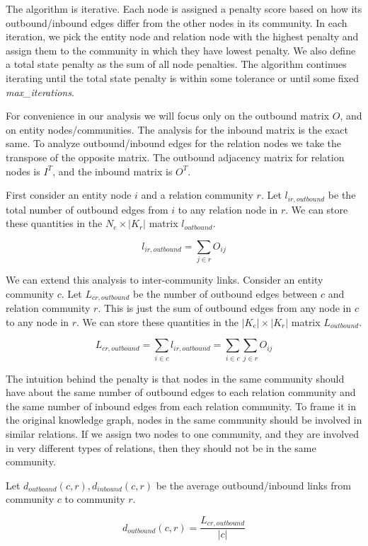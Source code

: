 \documentclass[12pt]{article}
\begin{document}
The algorithm is iterative. Each node is assigned a penalty score based on how
its outbound/inbound edges differ from the other nodes in its community. In each
iteration, we pick the entity node and relation node with the highest penalty
and assign them to the community in which they have lowest penalty. We also
define a total state penalty as the sum of all node penalties. The algorithm
continues iterating until the total state penalty is within some tolerance or
until some fixed \textit{max\_iterations}.

For convenience in our analysis we will focus only on the outbound matrix $O$,
and on entity nodes/communities. The analysis for the inbound matrix is the
exact same. To analyze outbound/inbound edges for the relation nodes we take the
transpose of the opposite matrix. The outbound adjacency matrix for relation
nodes is $I^T$, and the inbound matrix is $O^T$.

First consider an entity node $i$ and a relation community $r$. Let
$l_{ir,outbound}$ be the total number of outbound edges from $i$ to any relation
node in $r$. We can store these quantities in the $N_e\times |K_r|$ matrix
$l_{outbound}$.

$$l_{ir, outbound} = \sum_{j \in r} O_{ij}$$

We can extend this analysis to inter-community links. Consider an entity
community $c$. Let $L_{cr,outbound}$ be the number of outbound edges between $c$
and relation community $r$. This is just the sum of outbound edges from any node
in $c$ to any node in $r$. We can store these quantities in the $|K_e|\times
|K_r|$ matrix $L_{outbound}$.

$$L_{cr, outbound} = \sum_{i \in c} l_{ir, outbound} = \sum_{i \in c} \sum_{j \in r} O_{ij} $$

The intuition behind the penalty is that nodes in the same community should have
about the same number of outbound edges to each relation community and the same
number of inbound edges from each relation community. To frame it in the original
knowledge graph, nodes in the same community should be involved in similar relations.
If we assign two nodes to one community, and they are involved in very different
types of relations, then they should not be in the same community.

Let $d_{outbound}(c,r), d_{inbound}(c,r)$ be the average outbound/inbound links
from community $c$ to community $r$.

$$d_{outbound}(c,r) = \frac{L_{cr, outbound}}{|c|}$$
\end{document}
